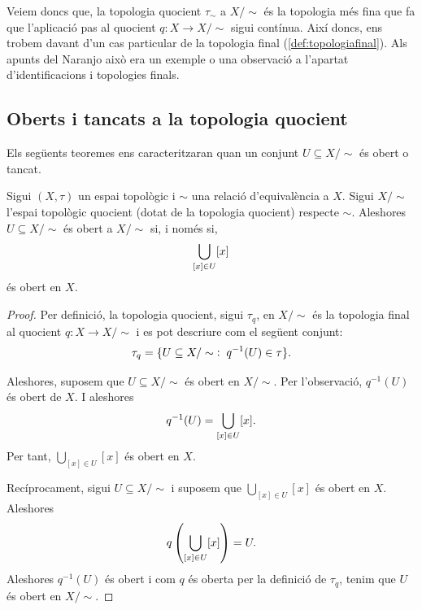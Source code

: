 \documentclass[../main.tex]{subfiles}
\begin{document}
Veiem doncs que, la topologia quocient $\tau_\sim$ a $X/\sim$ és la topologia més fina que fa que l'aplicació pas al quocient $q:X\rightarrow X/\sim$ sigui contínua. Així doncs, ens trobem davant d'un cas particular de la topologia final (\ref{def:topologiafinal}). Als apunts del Naranjo això era un exemple o una observació a l'apartat d'identificacions i topologies finals.

\subsection{Oberts i tancats a la topologia quocient}
Els següents teoremes ens caracteritzaran quan un conjunt $U\subseteq X/\sim$ és obert o tancat.

\begin{ter}
\label{ter:topologiaquocientobert} Sigui $(X,\tau)$ un espai topològic i $\sim$ una relació d'equivalència a $X$. Sigui $X/\sim$ l'espai topològic quocient (dotat de la topologia quocient) respecte $\sim$. Aleshores $U\subseteq X/\sim$ és obert a $X/\sim$ si, i només si, 
\begin{equation}
    \notag
    \bigcup_{[x]\in U}[x]
\end{equation}
és obert en $X$.
\end{ter}
\begin{proof}
Per definició, la topologia quocient, sigui $\tau_q$, en $X/\sim$ és la topologia final al quocient $q:X\rightarrow X/\sim$ i es pot descriure com el següent conjunt:
\begin{equation}
    \notag
    \tau_q = \{U\subseteq X/\sim\;:\;q^{-1}(U)\in\tau\} .
\end{equation}

Aleshores, suposem que $U\subseteq X/\sim$ és obert en $X/\sim$. Per l'observació, $q^{-1}(U)$ és obert de $X$. I aleshores
\begin{equation}
    \notag
    q^{-1}(U) = \bigcup_{[x]\in U}[x].
\end{equation}
Per tant, $\bigcup_{[x]\in U}[x]$ és obert en $X$.

Recíprocament, sigui $U\subseteq X/\sim$ i suposem que $\bigcup_{[x]\in U}[x]$ és obert en $X$. Aleshores
\begin{equation}
    \notag
    q\left(\bigcup_{[x]\in U}[x]\right) = U.
\end{equation}
Aleshores $q^{-1}(U)$ és obert i com $q$ és oberta per la definició de $\tau_q$, tenim que $U$ és obert en $X/\sim$.
\end{proof}
\end{document}
